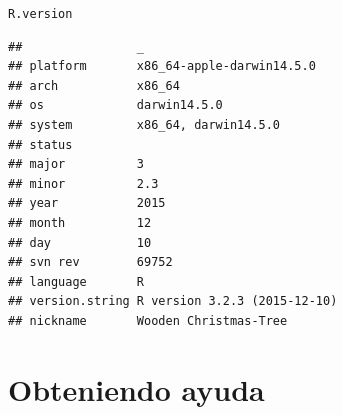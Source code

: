 \documentclass[11pt,a4paper,oneside]{book}\usepackage[]{graphicx}\usepackage[]{color}
\makeatletter
\newcommand{\hlstd}[1]{\textcolor[rgb]{0.345,0.345,0.345}{#1}}%
\newenvironment{kframe}{%
 \def\at@end@of@kframe{}%
 \ifinner\ifhmode%
  \def\at@end@of@kframe{\end{minipage}}%
  \begin{minipage}{\columnwidth}%
 \fi\fi%
 \def\FrameCommand##1{\hskip\@totalleftmargin \hskip-\fboxsep
 \colorbox{shadecolor}{##1}\hskip-\fboxsep
     \hskip-\linewidth \hskip-\@totalleftmargin \hskip\columnwidth}%
 \MakeFramed {\advance\hsize-\width
   \@totalleftmargin\z@ \linewidth\hsize
   \@setminipage}}%
 {\par\unskip\endMakeFramed%
 \at@end@of@kframe}
\newenvironment{knitrout}{}{} %
\makeatother
\begin{document}
\begin{itemize}
\begin{knitrout}
\color{fgcolor}\begin{kframe}
\begin{alltt}
\hlstd{R.version}
\end{alltt}
\begin{verbatim}
##                _                           
## platform       x86_64-apple-darwin14.5.0   
## arch           x86_64                      
## os             darwin14.5.0                
## system         x86_64, darwin14.5.0        
## status                                     
## major          3                           
## minor          2.3                         
## year           2015                        
## month          12                          
## day            10                          
## svn rev        69752                       
## language       R                           
## version.string R version 3.2.3 (2015-12-10)
## nickname       Wooden Christmas-Tree
\end{verbatim}
\end{kframe}
\end{knitrout}

\section{Obteniendo ayuda}


\end{itemize}
\end{document}
